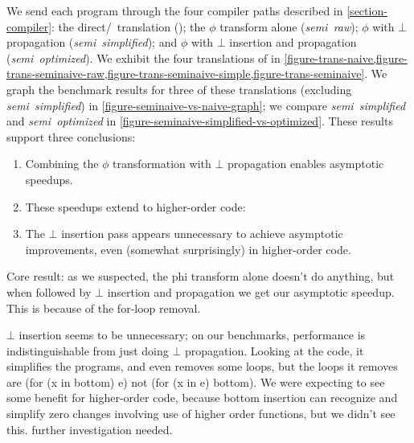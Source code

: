 

\noindent
We send each program through the four compiler paths described in \cref{section-compiler}: the direct/\naive\ translation (\emph{\naive}); the $\phi$ transform alone (\emph{semi\naive\ raw}); $\phi$ with $\bot$ propagation (\emph{semi\naive\ simplified}); and $\phi$ with $\bot$ insertion and propagation (\emph{semi\naive\ optimized}).
%
We exhibit the four translations of  in \cref{figure-trans-naive,figure-trans-seminaive-raw,figure-trans-seminaive-simple,figure-trans-seminaive}.
%
We graph the benchmark results for three of these translations (excluding \emph{semi\naive\ simplified}) in \cref{figure-seminaive-vs-naive-graph}; we compare \emph{semi\naive\ simplified} and \emph{semi\naive\ optimized} in \cref{figure-seminaive-simplified-vs-optimized}.
%
These results support three conclusions:

\begin{enumerate}
\item Combining the $\phi$ transformation with $\bot$ propagation enables asymptotic speedups. \XXX

\item These speedups extend to higher-order code: \XXX

\item The $\bot$ insertion pass appears unnecessary to achieve asymptotic improvements, even (somewhat surprisingly) in higher-order code. \XXX
\end{enumerate}

\XXX
Core result: as we suspected, the phi transform alone doesn't do anything, but when followed by $\bot$ insertion and propagation we get our asymptotic speedup. This is because of the for-loop removal.

\XXX
$\bot$ insertion seems to be unnecessary; on our benchmarks, performance is indistinguishable from just doing $\bot$ propagation. Looking at the code, it simplifies the programs, and even removes some loops, but the loops it removes are (for (x in bottom) e) not (for (x in e) bottom).  We were expecting to see some benefit for higher-order code, because bottom insertion can recognize and simplify zero changes involving use of higher order functions, but we didn't see this. further investigation needed.


